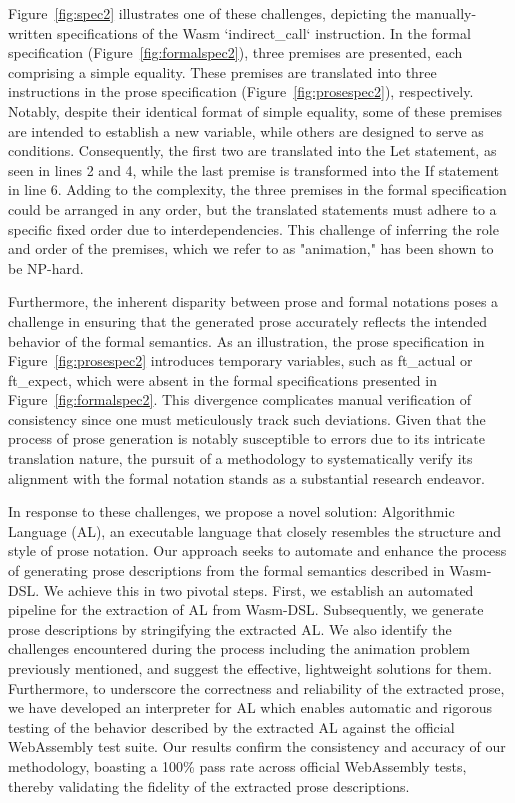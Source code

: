 Figure~\ref{fig:spec2} illustrates one of these challenges, depicting the
manually-written specifications of the Wasm `indirect\_call` instruction. In
the formal specification (Figure~\ref{fig:formalspec2}), three premises are
presented, each comprising a simple equality. These premises are translated
into three instructions in the prose specification
(Figure~\ref{fig:prosespec2}), respectively. Notably, despite their identical
format of simple equality, some of these premises are intended to establish a
new variable, while others are designed to serve as conditions. Consequently,
the first two are translated into the Let statement, as seen in lines 2 and 4,
while the last premise is transformed into the If statement in line 6. Adding
to the complexity, the three premises in the formal specification could be
arranged in any order, but the translated statements must adhere to a specific
fixed order due to interdependencies. This challenge of inferring the role and
order of the premises, which we refer to as "animation," has been shown to be
NP-hard.

Furthermore, the inherent disparity between prose and formal notations poses a
challenge in ensuring that the generated prose accurately reflects the intended
behavior of the formal semantics. As an illustration, the prose specification
in Figure~\ref{fig:prosespec2} introduces temporary variables, such as
ft\_actual or ft\_expect, which were absent in the formal specifications
presented in Figure~\ref{fig:formalspec2}. This divergence complicates manual
verification of consistency since one must meticulously track such deviations.
Given that the process of prose generation is notably susceptible to errors due
to its intricate translation nature, the pursuit of a methodology to
systematically verify its alignment with the formal notation stands as a
substantial research endeavor.

In response to these challenges, we propose a novel solution: Algorithmic
Language (AL), an executable language that closely resembles the structure and
style of prose notation. Our approach seeks to automate and enhance the process
of generating prose descriptions from the formal semantics described in
Wasm-DSL. We achieve this in two pivotal steps. First, we establish an
automated pipeline for the extraction of AL from Wasm-DSL. Subsequently, we
generate prose descriptions by stringifying the extracted AL. We also identify
the challenges encountered during the process including the animation problem
previously mentioned, and suggest the effective, lightweight solutions for
them. Furthermore, to underscore the correctness and reliability of the
extracted prose, we have developed an interpreter for AL which enables
automatic and rigorous testing of the behavior described by the extracted AL
against the official WebAssembly test suite. Our results confirm the
consistency and accuracy of our methodology, boasting a 100\% pass rate across
official WebAssembly tests, thereby validating the fidelity of the extracted
prose descriptions.

